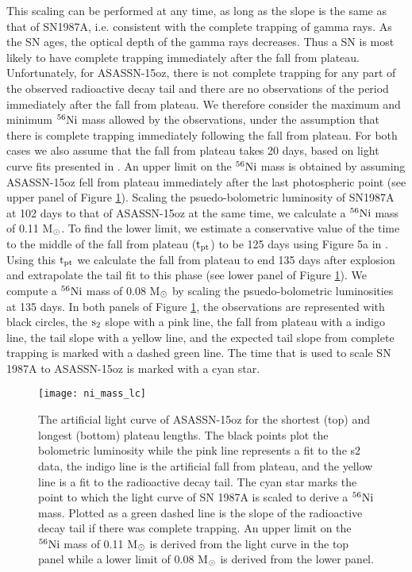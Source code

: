 \documentclass[a4paper,fleqn,usenatbib]{mnras}
\newcommand{\msun}{M$\rm{_{\odot}}$ }
\newcommand{\msunperiod}{M$\rm{_{\odot}}$}
\begin{document}
This scaling can be performed at any time, as long as the slope is the same as that of SN1987A, i.e. consistent with the complete trapping of gamma rays.
As the SN ages, the optical depth of the gamma rays decreases.
Thus a SN is most likely to have complete trapping immediately after the fall from plateau. 
Unfortunately, for ASASSN-15oz, there is not complete trapping for any part of the observed radioactive decay tail and there are no observations of the period immediately after the fall from plateau. 
We therefore consider the maximum and minimum $\rm{{}^{56}Ni}$ mass allowed by the observations, under the assumption that there is complete trapping immediately following the fall from plateau. 
For both cases we also assume that the fall from plateau takes 20 days, based on light curve fits presented in \citet{2016valenti}. 
An upper limit on the $\rm{{}^{56}Ni}$ mass is obtained by assuming ASASSN-15oz fell from plateau immediately after the last photospheric point  (see upper panel of Figure \ref{fig:Ni}).
Scaling the psuedo-bolometric luminosity of SN1987A at 102 days to that of ASASSN-15oz at the same time, we calculate a $\rm{{}^{56}Ni}$ mass of 0.11 \msunperiod.
To find the lower limit, we estimate a conservative value of the time to the middle of the fall from plateau ($\rm{t_{pt}}$) to be 125 days using Figure 5a in \citet{2016valenti}.
Using this $\rm{t_{pt}}$ we calculate the fall from plateau to end 135 days after explosion and extrapolate the tail fit to this phase (see lower panel of Figure \ref{fig:Ni}). 
We compute a $\rm{{}^{56}Ni}$ mass of 0.08 \msun by scaling the psuedo-bolometric luminosities at 135 days.
In both panels of Figure \ref{fig:Ni}, the observations are represented with black circles, the $\rm{s_{2}}$ slope with a pink line, the fall from plateau with a indigo line, the tail slope with a yellow line, and the expected tail slope from complete trapping is marked with a dashed green line. 
The time that is used to scale SN 1987A to ASASSN-15oz is marked with a cyan star.
\begin{figure}
\begin{center}
\texttt{[image: ni\_mass\_lc]} %
\caption{The artificial light curve of ASASSN-15oz for the shortest (top) and longest (bottom) plateau lengths. 
The black points plot the bolometric luminosity while the pink line represents a fit to the s2 data, the indigo line is the artificial fall from plateau, and the yellow line is a fit to the radioactive decay tail.
The cyan star marks the point to which the light curve of SN 1987A is scaled to derive a $\rm{{}^{56}Ni}$ mass. 
Plotted as a green dashed line is the slope of the radioactive decay tail if there was complete trapping.
An upper limit on the $\rm{{}^{56}Ni}$ mass of 0.11 \msun is derived from the light curve in the top panel while a lower limit of 0.08 \msun is derived from the lower panel. }
\label{fig:Ni}
\end{center}
\end{figure}
\end{document}
